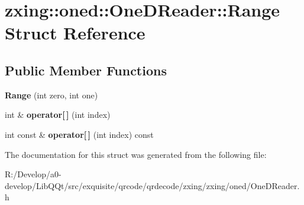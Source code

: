 \hypertarget{structzxing_1_1oned_1_1_one_d_reader_1_1_range}{}\section{zxing\+:\+:oned\+:\+:One\+D\+Reader\+:\+:Range Struct Reference}
\label{structzxing_1_1oned_1_1_one_d_reader_1_1_range}
\subsection*{Public Member Functions}
\begin{DoxyCompactItemize}
\item 
\mbox{\label{structzxing_1_1oned_1_1_one_d_reader_1_1_range_ab95846fbee2cb81c4287f7119a0ac8b7}} 
{\bfseries Range} (int zero, int one)
\item 
\mbox{\label{structzxing_1_1oned_1_1_one_d_reader_1_1_range_a379eed7dfc91b9f255f449e312e231a0}} 
int \& {\bfseries operator\mbox{[}$\,$\mbox{]}} (int index)
\item 
\mbox{\label{structzxing_1_1oned_1_1_one_d_reader_1_1_range_addbff005eac49515c6bc254154d9b6bb}} 
int const  \& {\bfseries operator\mbox{[}$\,$\mbox{]}} (int index) const
\end{DoxyCompactItemize}


The documentation for this struct was generated from the following file\+:\begin{DoxyCompactItemize}
\item 
R\+:/\+Develop/a0-\/develop/\+Lib\+Q\+Qt/src/exquisite/qrcode/qrdecode/zxing/zxing/oned/One\+D\+Reader.\+h\end{DoxyCompactItemize}
